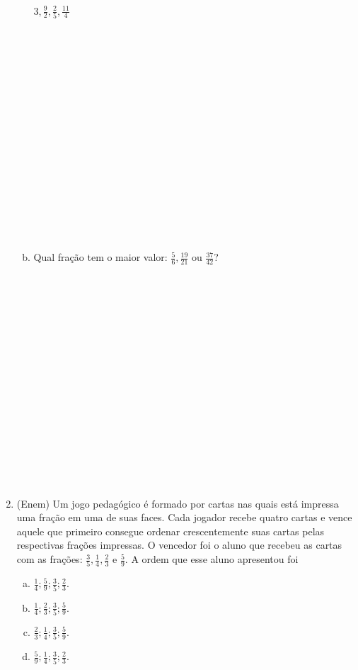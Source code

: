 \documentclass[a4paper,14pt]{article}
\begin{document}
\begin{multicols}{2}
\begin{enumerate}
\begin{enumerate}[a)]
				$3, \frac{9}{2}, \frac{2}{5}, \frac{11}{4}$ \\\\\\\\\\\\\\\\\\\\\\\\\\\\\\\\\\
				\item Qual fração tem o maior valor: $\frac{5}{6}, \frac{19}{21}$ ou $\frac{37}{42}$? \\\\\\\\\\\\\\\\\\\\\\\\\\\\\\\\\\
			\end{enumerate}
			\item (Enem) Um jogo pedagógico é formado por cartas nas quais está impressa uma fração em uma de suas faces. Cada jogador recebe quatro cartas e vence aquele que primeiro consegue ordenar crescentemente suas cartas pelas respectivas frações impressas. O vencedor foi o aluno que recebeu as cartas com as frações: $\frac{3}{5}, \frac{1}{4}, \frac{2}{3}$ e $\frac{5}{9}$. A ordem que esse aluno apresentou foi
			\begin{enumerate}[a)]
				\item $\frac{1}{4}; \frac{5}{9}; \frac{3}{5}; \frac{2}{3}$.
				\item $\frac{1}{4}; \frac{2}{3}; \frac{3}{5}; \frac{5}{9}$.
				\item $\frac{2}{3}; \frac{1}{4}; \frac{3}{5}; \frac{5}{9}$.
				\item $\frac{5}{9}; \frac{1}{4}; \frac{3}{5}; \frac{2}{3}$.

\end{enumerate}
\end{enumerate}
\end{multicols}
\end{document}
